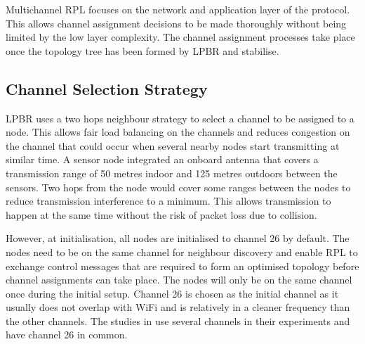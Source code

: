 Multichannel RPL focuses on the network and application layer of the protocol. This allows channel assignment decisions to be made thoroughly without being limited by the low layer complexity. The channel assignment processes take place once the topology tree has been formed by LPBR and stabilise.



\subsection{Channel Selection Strategy}

LPBR uses a two hops neighbour strategy to select a channel to be assigned to a node. This allows fair load balancing on the channels and reduces congestion on the channel that could occur when several nearby nodes start transmitting at similar time. A sensor node integrated an onboard antenna that covers a transmission range of 50 metres indoor and 125 metres outdoors between the sensors. Two hops from the node would cover some ranges between the nodes to reduce transmission interference to a minimum. This allows transmission to happen at the same time without the risk of packet loss due to collision. 

However, at initialisation, all nodes are initialised to channel 26 by default. The nodes need to be on the same channel for neighbour discovery and enable RPL to exchange control messages that are required to form an optimised topology before channel assignments can take place. The nodes will only be on the same channel once during the initial setup. Channel 26 is chosen as the initial channel as it usually does not overlap with WiFi and is relatively in a cleaner frequency than the other channels. The studies in \cite{chrysso}\cite{micmac}\cite{watteyne} use several channels in their experiments and have channel 26 in common.
	


